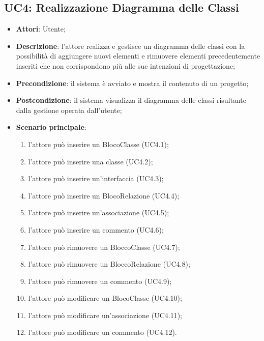 \subsection{UC4: Realizzazione Diagramma delle Classi}
\label{UC4}
\begin{itemize}
	\item \textbf{Attori}: Utente;
	\item \textbf{Descrizione}: l'attore realizza e gestisce un diagramma delle classi con la possibilità di aggiungere nuovi elementi e rimuovere elementi precedentemente inseriti che non corrispondono più alle sue intenzioni di progettazione;
	\item \textbf{Precondizione}: il sistema è avviato e mostra il contenuto di un progetto;
	\item \textbf{Postcondizione}: il sistema visualizza il diagramma delle classi risultante dalla gestione operata dall'utente;
	\item \textbf{Scenario principale}:
	\begin{enumerate}
		\item l'attore può inserire un BlocoClasse (UC4.1);
		\item l'attore può inserire una classe (UC4.2);
		\item l'attore può inserire un'interfaccia (UC4.3);
		\item l'attore può inserire un BlocoRelazione (UC4.4);
		\item l'attore può inserire un'associazione (UC4.5);
		\item l'attore può inserire un commento (UC4.6);
		\item l'attore può rimuovere un BloccoClasse (UC4.7);
		\item l'attore può rimuovere un BloccoRelazione (UC4.8);
		\item l'attore può rimuovere un commento (UC4.9);
		\item l'attore può modificare un BlocoClasse (UC4.10);
		\item l'attore può modificare un'associazione (UC4.11);
		\item l'attore può modificare un commento (UC4.12).
	\end{enumerate}
\end{itemize}

